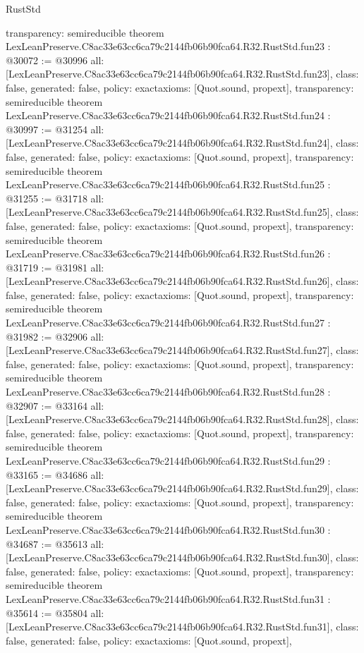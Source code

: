 \begin{lexlean}{RustStd}
\begin{coremodule}
{  transparency: semireducible
}
theorem LexLeanPreserve.C8ac33e63cc6ca79c2144fb06b90fca64.R32.RustStd.fun23 : @30072 := @30996 {
  all: [LexLeanPreserve.C8ac33e63cc6ca79c2144fb06b90fca64.R32.RustStd.fun23],
  class: false,
  generated: false,
  policy: exact{axioms: [Quot.sound, propext]},
  transparency: semireducible
}
theorem LexLeanPreserve.C8ac33e63cc6ca79c2144fb06b90fca64.R32.RustStd.fun24 : @30997 := @31254 {
  all: [LexLeanPreserve.C8ac33e63cc6ca79c2144fb06b90fca64.R32.RustStd.fun24],
  class: false,
  generated: false,
  policy: exact{axioms: [Quot.sound, propext]},
  transparency: semireducible
}
theorem LexLeanPreserve.C8ac33e63cc6ca79c2144fb06b90fca64.R32.RustStd.fun25 : @31255 := @31718 {
  all: [LexLeanPreserve.C8ac33e63cc6ca79c2144fb06b90fca64.R32.RustStd.fun25],
  class: false,
  generated: false,
  policy: exact{axioms: [Quot.sound, propext]},
  transparency: semireducible
}
theorem LexLeanPreserve.C8ac33e63cc6ca79c2144fb06b90fca64.R32.RustStd.fun26 : @31719 := @31981 {
  all: [LexLeanPreserve.C8ac33e63cc6ca79c2144fb06b90fca64.R32.RustStd.fun26],
  class: false,
  generated: false,
  policy: exact{axioms: [Quot.sound, propext]},
  transparency: semireducible
}
theorem LexLeanPreserve.C8ac33e63cc6ca79c2144fb06b90fca64.R32.RustStd.fun27 : @31982 := @32906 {
  all: [LexLeanPreserve.C8ac33e63cc6ca79c2144fb06b90fca64.R32.RustStd.fun27],
  class: false,
  generated: false,
  policy: exact{axioms: [Quot.sound, propext]},
  transparency: semireducible
}
theorem LexLeanPreserve.C8ac33e63cc6ca79c2144fb06b90fca64.R32.RustStd.fun28 : @32907 := @33164 {
  all: [LexLeanPreserve.C8ac33e63cc6ca79c2144fb06b90fca64.R32.RustStd.fun28],
  class: false,
  generated: false,
  policy: exact{axioms: [Quot.sound, propext]},
  transparency: semireducible
}
theorem LexLeanPreserve.C8ac33e63cc6ca79c2144fb06b90fca64.R32.RustStd.fun29 : @33165 := @34686 {
  all: [LexLeanPreserve.C8ac33e63cc6ca79c2144fb06b90fca64.R32.RustStd.fun29],
  class: false,
  generated: false,
  policy: exact{axioms: [Quot.sound, propext]},
  transparency: semireducible
}
theorem LexLeanPreserve.C8ac33e63cc6ca79c2144fb06b90fca64.R32.RustStd.fun30 : @34687 := @35613 {
  all: [LexLeanPreserve.C8ac33e63cc6ca79c2144fb06b90fca64.R32.RustStd.fun30],
  class: false,
  generated: false,
  policy: exact{axioms: [Quot.sound, propext]},
  transparency: semireducible
}
theorem LexLeanPreserve.C8ac33e63cc6ca79c2144fb06b90fca64.R32.RustStd.fun31 : @35614 := @35804 {
  all: [LexLeanPreserve.C8ac33e63cc6ca79c2144fb06b90fca64.R32.RustStd.fun31],
  class: false,
  generated: false,
  policy: exact{axioms: [Quot.sound, propext]},
}
\end{coremodule}
\end{lexlean}

